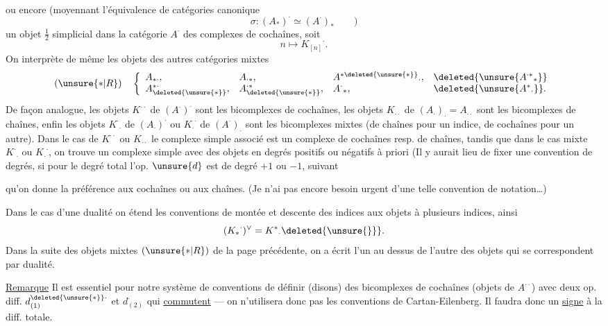 ou encore (moyennant l'équivalence de catégories canonique
\[
 \sigma:(A_*)^{\cdot}\simeq(A^{\cdot})_*\qquad)
\]
un objet $\tfrac12$ simplicial dans la catégorie $A^{\cdot}$ des complexes
de cochaînes, soit
\[
 n\longmapsto {K_{[n]}}^{\cdot}.
\]
On interprète de même les objets des autres catégories mixtes
\[
 (\unsure{*|R})\quad
 \left\{\begin{array}{llll}
 A_{*\cdot},&A_{\cdot*},&{A^{*\deleted{\unsure{*}}}}_{\cdot},&
 \deleted{\unsure{{A^{\cdot*}}_*}}\\
 A^{*\cdot}_{\deleted{\unsure{*}}},&A^{\cdot*}_{\deleted{\unsure{*}}},&
 {A^{\cdot}}_*,&\deleted{\unsure{{A^*}_{\cdot}}}.
 \end{array}\right.
\]
De façon analogue, les objets $K^{\cdot\cdot}$ de $(A^{\cdot})^{\cdot}$
sont les bicomplexes de cochaînes, les objets $K_{\cdot\cdot}$ de
$(A_{\cdot})_{\cdot}=A_{\cdot\cdot}$ sont les bicomplexes de chaînes,
enfin les objets ${K^{\cdot}}_{\cdot}$ de $(A_{\cdot})^{\cdot}$ ou
${K_{\cdot}}^{\cdot}$ de $(A^{\cdot})_{\cdot}$ sont les bicomplexes mixtes
 (de chaînes pour un indice, de cochaînes pour
un autre). Dans le cas de $K^{\cdot\cdot}$ ou $K_{\cdot\cdot}$ le complexe
simple associé est un complexe de cochaînes resp. de chaînes, tandis que
dans le cas mixte ${K^{\cdot}}_{\cdot}$ ou ${K_{\cdot}}^{\cdot}$, on trouve
un complexe simple avec des objets en degrés positifs ou négatifs à priori
(Il y aurait lieu de fixer une convention de degrés, si pour le degré total
l'op. $\unsure{d}$ est de degré $+1$ ou $-1$, suivant

qu'on donne la préférence aux  cochaînes ou aux chaînes.
(Je n'ai pas encore besoin urgent d'une telle convention de notation\ldots)

Dans le cas d'une dualité
on étend les conventions de montée et descente des indices aux objets à
plusieurs indices, ainsi
\[
 ({K_*}^{\cdot})^\vee={K^*}_{\cdot}\deleted{\unsure{\}}}.
\]
Dans la suite des objets mixtes $(\unsure{*|R})$ de la page précédente,
on a écrit l'un au dessus de l'autre des objets qui se correspondent par dualité.

\uline{Remarque} Il est essentiel pour notre système de conventions de définir
(disons) des bicomplexes de cochaînes (objets de $A^{\cdot\cdot}$) avec deux
op. diff. $d_{(1)}^{\deleted{\unsure{*}}\cdot}$ et $d_{(2)}^{\cdot}$ qui
\uline{commutent} --- on n'utilisera donc pas les conventions de
Cartan-Eilenberg. Il faudra donc un \uline{signe} à la diff. totale.

